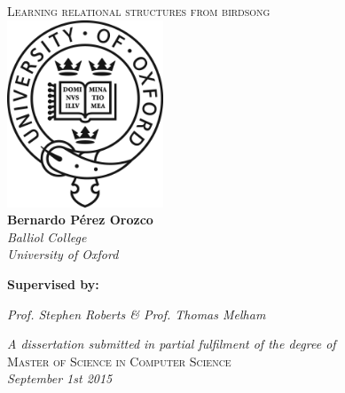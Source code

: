 \begin{titlepage} 
\begin{center}


\textsc{\LARGE Learning relational structures from birdsong}\\[2cm]
\includegraphics[width=0.35\textwidth]{./images/logo.png}\\[2cm]

{
\Large 
\textbf{Bernardo Pérez Orozco}\\
\textsl{Balliol College\\
University of Oxford\\}
}
\vspace{15mm}
{
\Large
\par\textbf{Supervised by:}
\par\textsl{Prof. Stephen Roberts \& Prof. Thomas Melham}
\vfill
}
{\large
\textsl{A dissertation submitted in partial fulfilment of the degree of\\}
}
{\Large 
\textsc{Master of Science in Computer Science\\}
}
{\large
\textsl{September 1st 2015}
}

\end{center} 
\end{titlepage}